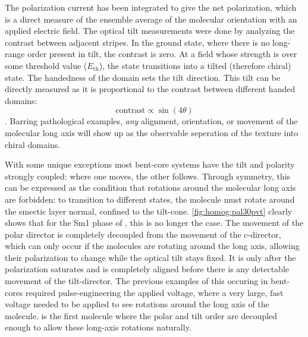 \documentclass[aagreenthesis]{subfiles}
\begin{document}
The polarization current has been integrated to give the net polarization, which
is a direct measure of the ensemble average of the molecular orientation with an
applied electric field. The optical tilt measurements were done by analyzing the
contrast between adjacent stripes. In the ground
state, where there is no long-range order present in tilt, the contrast is zero.
At a field whose strength is over some threshold value ($E_\textrm{th}$), the
state transitions into a tilted (therefore chiral) state. The handedness of the
domain sets the tilt direction. This tilt can be directly measured as it is
proportional to the contrast between different handed domains:
\begin{equation}
    \textrm{contrast}\propto \sin(4\theta)
\end{equation}.
Barring pathological examples, \textit{any} alignment, orientation, or movement
of the molecular long axis will show up as the observable seperation of the
texture into chiral domains. 


With some unique exceptions\cite{michi}
most bent-core systems have the tilt and
polarity strongly coupled: where one moves, the other follows. Through symmetry,
this can be expressed as the condition that rotations around the molecular long
axis are forbidden: to transition to different states, the molecule must rotate
around the smectic layer normal, confined to the tilt-cone.
\autoref{fig:homog:pal30pvt} clearly shows that for the Sm1 phase of
\nfour{}, this is no longer the case. The movement of the polar
director is completely decoupled from the
movement of the c-director, which can only occur if the \nfour{} molecules
are rotating around the long axis, allowing their polarization to change while
the optical tilt stays fixed. It is only
after the polarization saturates and is completely aligned
before there is any detectable movement of the tilt-director. The previous
examples of this occuring in bent-cores required pulse-engineering the applied
voltage,
where a very large, fast voltage needed to be applied to see rotations around
the long axis of the molecule. \nfour{} is the first molecule where the polar
and tilt order are decoupled enough to allow these long-axis rotations
naturally.
\end{document}
